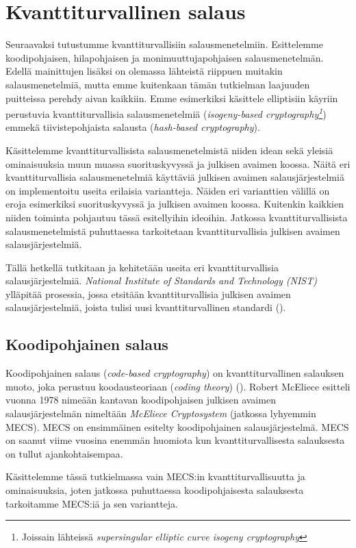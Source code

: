\chapter{Kvanttiturvallinen salaus\label{results}}
Seuraavaksi tutustumme kvanttiturvallisiin salausmenetelmiin. Esittelemme koodipohjaisen, hilapohjaisen ja monimuuttujapohjaisen salausmenetelmän. Edellä mainittujen lisäksi on olemassa lähteistä riippuen muitakin salausmenetelmiä, mutta emme kuitenkaan tämän tutkielman laajuuden puitteissa perehdy aivan kaikkiin. Emme esimerkiksi käsittele elliptisiin käyriin perustuvia kvanttiturvallisia salausmenetelmiä (\emph{isogeny-based cryptography\footnote{Joissain lähteissä \emph{supersingular elliptic curve isogeny cryptography}}}) emmekä tiivistepohjaista salausta (\emph{hash-based cryptography}).

Käsittelemme kvanttiturvallisista salausmenetelmistä niiden idean sekä yleisiä ominaisuuksia muun muassa suorituskyvyssä ja julkisen avaimen koossa. Näitä eri kvanttiturvallisia salausmenetelmiä käyttäviä julkisen avaimen salausjärjestelmiä on implementoitu useita erilaisia variantteja. Näiden eri varianttien välillä on eroja esimerkiksi suorituskyvyssä ja julkisen avaimen koossa. Kuitenkin kaikkien niiden toiminta pohjautuu tässä esitellyihin ideoihin. Jatkossa kvanttiturvallisista salausmenetelmistä puhuttaessa tarkoitetaan kvanttiturvallisia julkisen avaimen salausjärjestelmiä.

Tällä hetkellä tutkitaan ja kehitetään useita eri kvanttiturvallisia salausjärjestelmiä. \emph{National Institute of Standards and Technology (NIST)} ylläpitää prosessia, jossa etsitään kvanttiturvallisia julkisen avaimen salausjärjestelmiä, joista tulisi uusi kvanttiturvallinen standardi (\cite{alagic2020status}).

\section{Koodipohjainen salaus}
Koodipohjainen salaus (\emph{code-based cryptography}) on kvanttiturvallinen salauksen muoto, joka perustuu koodausteoriaan (\emph{coding theory}) (\cite{repka2014overview}). Robert McEliece esitteli vuonna 1978 nimeään kantavan koodipohjaisen julkisen avaimen salausjärjestelmän nimeltään \emph{McEliece Cryptosystem} (jatkossa lyhyemmin MECS). MECS on ensimmäinen esitelty koodipohjainen salausjärjestelmä. MECS on saanut viime vuosina enemmän huomiota kun kvanttiturvallisesta salauksesta on tullut ajankohtaisempaa.

Käsittelemme tässä tutkielmassa vain MECS:in kvanttiturvallisuutta ja ominaisuuksia, joten jatkossa puhuttaessa koodipohjaisesta salauksesta tarkoitamme MECS:iä ja sen variantteja.

